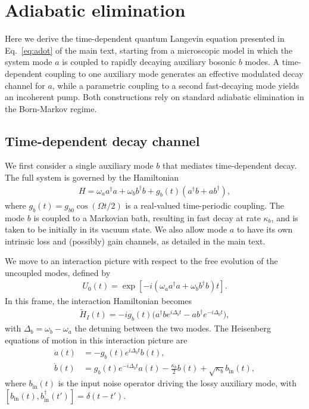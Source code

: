 \documentclass[a4paper,twocolumn,floatfix,10pt,superscriptaddress]%
{quantumarticle}
\begin{document}




\clearpage
\newpage


\appendix
\section{Adiabatic elimination}
\label{app:AElimination}
Here we derive the time-dependent quantum Langevin equation presented in Eq.~\eqref{eq:adot} of the main text, starting from a microscopic model in which the system mode $a$ is coupled to rapidly decaying auxiliary bosonic $b$ modes. A time-dependent coupling to one auxiliary mode generates an effective modulated decay channel for $a$, while a parametric coupling to a second fast-decaying mode yields an incoherent pump. Both constructions rely on standard adiabatic elimination in the Born-Markov regime.

\subsection{Time-dependent decay channel}

We first consider a single auxiliary mode $b$ that mediates time-dependent decay. The full system is governed by the Hamiltonian
\begin{align}
H = \omega_a a^\dagger a + \omega_b b^\dagger b +  g_b(t) (a^\dagger b + a b^\dagger),
\end{align}
where $g_b(t) = g_{b0} \cos(\Omega t/2)$ is a real-valued time-periodic coupling. The mode $b$ is coupled to a Markovian bath, resulting in fast decay at rate $\kappa_b$, and is taken to be initially in its vacuum state. We also allow mode $a$ to have its own intrinsic loss and (possibly) gain channels, as detailed in the main text.

We move to an interaction picture with respect to the free evolution of the uncoupled modes, defined by
\begin{align}
U_0(t) = \exp[-i(\omega_a a^\dagger a + \omega_b b^\dagger b)t].
\end{align}
In this frame, the interaction Hamiltonian becomes
\begin{align}
\tilde{H}_I(t) = -i g_b(t) \big(a^\dagger b e^{i \Delta_b t} - a b^\dagger e^{-i \Delta_b t}\big),
\end{align}
with $\Delta_b = \omega_b - \omega_a$ the detuning between the two modes. The Heisenberg equations of motion in this interaction picture are
\begin{align}
\dot{a}(t) &= -g_b(t) e^{i \Delta_b t} b(t), \\
\dot{b}(t) &=  g_b(t) e^{-i \Delta_b t} a(t) - \frac{\kappa_b}{2} b(t) +\sqrt{\kappa_b} b_{\text{in}}(t),
\end{align}
where $b_{\text{in}}(t)$ is the input noise operator driving the lossy auxiliary mode, with
$[b_{\text{in}}(t), b_{\text{in}}^\dagger(t')] = \delta(t - t')$.
\end{document}
